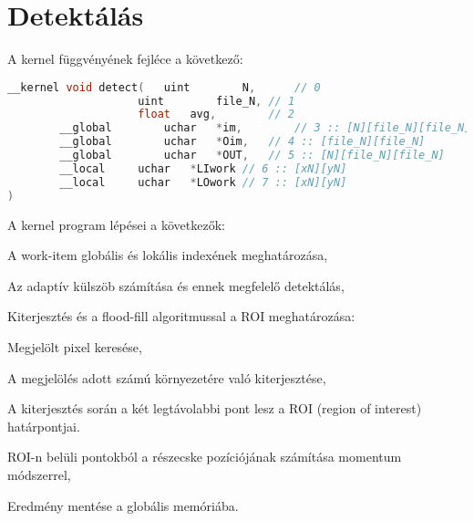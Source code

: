 \section{Detektálás}
\noindent A kernel függvényének fejléce a következő:
\begin{lstlisting}[language=C++]
__kernel void detect(	uint		N,		// 0
					uint		file_N,	// 1					
					float	avg,		// 2
		__global		uchar	*im,		// 3 :: [N][file_N][file_N]
		__global		uchar	*Oim,	// 4 :: [file_N][file_N]
		__global		uchar	*OUT,	// 5 :: [N][file_N][file_N]
		__local		uchar	*LIwork	// 6 :: [xN][yN]
		__local		uchar	*LOwork	// 7 :: [xN][yN]
)
\end{lstlisting}

\noindent A kernel program lépései a következők:
	\begin{enumerate*}
		\item A work-item globális és lokális indexének meghatározása,
		\item Az adaptív külszöb számítása és ennek megfelelő detektálás,
		\item Kiterjesztés és a flood-fill algoritmussal a ROI meghatározása:
		\begin{enumerate*}
			\item Megjelölt pixel keresése,
			\item A megjelölés adott számú környezetére való kiterjesztése,
			\item A kiterjesztés során a két legtávolabbi pont lesz a ROI (region of interest) határpontjai.
		\end{enumerate*}
		\item ROI-n belüli pontokból a részecske pozíciójának számítása momentum módszerrel,
		\item Eredmény mentése a globális memóriába.
	\end{enumerate*}
	
	